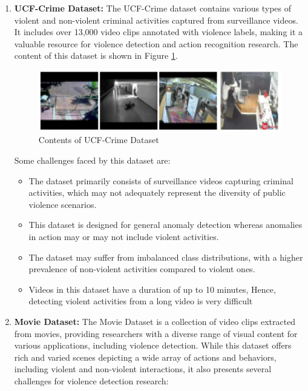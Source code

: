 \begin{enumerate}
    \item \textbf{UCF-Crime Dataset:}
    The UCF-Crime dataset contains various types of violent and non-violent criminal activities captured from surveillance videos. It includes over 13,000 video clips annotated with violence labels, making it a valuable resource for violence detection and action recognition research. The content of this dataset is shown in Figure \ref{ucfcontent}. \\
    
    \begin{figure}[htbp!]
         \centering
         \includegraphics[width=1\linewidth]{Images/UCF.png}
        \caption{Contents of UCF-Crime Dataset}
        \label{ucfcontent}
    \end{figure}
    
\noindent Some challenges faced by this dataset are:
    \begin{itemize}
        \item The dataset primarily consists of surveillance videos capturing criminal activities, which may not adequately represent the diversity of public violence scenarios.
        \item This dataset is designed for general anomaly detection whereas anomalies in action may or may not include violent activities.
        \item The dataset may suffer from imbalanced class distributions, with a higher prevalence of non-violent activities compared to violent ones. 
        \item Videos in this dataset have a duration of up to 10 minutes, Hence, detecting violent activities from a long video is very difficult \cite{ourdataset} \\
    \end{itemize}

    \item \textbf{Movie Dataset:}
    The Movie Dataset is a collection of video clips extracted from movies, providing researchers with a diverse range of visual content for various applications, including violence detection. While this dataset offers rich and varied scenes depicting a wide array of actions and behaviors, including violent and non-violent interactions, it also presents several challenges for violence detection research:
       


\end{enumerate}
